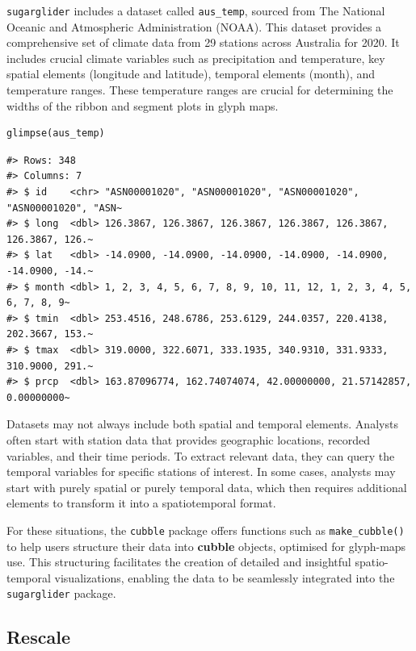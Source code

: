 \texttt{sugarglider} includes a dataset called \texttt{aus\_temp}, sourced from The National Oceanic and Atmospheric Administration (NOAA). This dataset provides a comprehensive set of climate data from 29 stations across Australia for 2020. It includes crucial climate variables such as precipitation and temperature, key spatial elements (longitude and latitude), temporal elements (month), and temperature ranges. These temperature ranges are crucial for determining the widths of the ribbon and segment plots in glyph maps.

\begin{verbatim}
glimpse(aus_temp)
\end{verbatim}

\begin{verbatim}
#> Rows: 348
#> Columns: 7
#> $ id    <chr> "ASN00001020", "ASN00001020", "ASN00001020", "ASN00001020", "ASN~
#> $ long  <dbl> 126.3867, 126.3867, 126.3867, 126.3867, 126.3867, 126.3867, 126.~
#> $ lat   <dbl> -14.0900, -14.0900, -14.0900, -14.0900, -14.0900, -14.0900, -14.~
#> $ month <dbl> 1, 2, 3, 4, 5, 6, 7, 8, 9, 10, 11, 12, 1, 2, 3, 4, 5, 6, 7, 8, 9~
#> $ tmin  <dbl> 253.4516, 248.6786, 253.6129, 244.0357, 220.4138, 202.3667, 153.~
#> $ tmax  <dbl> 319.0000, 322.6071, 333.1935, 340.9310, 331.9333, 310.9000, 291.~
#> $ prcp  <dbl> 163.87096774, 162.74074074, 42.00000000, 21.57142857, 0.00000000~
\end{verbatim}

Datasets may not always include both spatial and temporal elements. Analysts often start with station data that provides geographic locations, recorded variables, and their time periods. To extract relevant data, they can query the temporal variables for specific stations of interest. In some cases, analysts may start with purely spatial or purely temporal data, which then requires additional elements to transform it into a spatiotemporal format.

For these situations, the \texttt{cubble} package offers functions such as \texttt{make\_cubble()} to help users structure their data into \textbf{cubble} objects, optimised for glyph-maps use. This structuring facilitates the creation of detailed and insightful spatio-temporal visualizations, enabling the data to be seamlessly integrated into the \texttt{sugarglider} package.

\hypertarget{rescale}{%
\subsection{Rescale}\label{rescale}}

